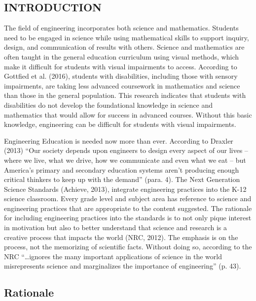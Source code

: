 \documentclass[11.5pt]{sig-alternate} %
\begin{document}
\begin{large}
\section*{INTRODUCTION}

The field of engineering incorporates both science and mathematics. Students need to be engaged in science while using mathematical skills to support inquiry, design, and communication of results with others. Science and mathematics are often taught in the general education curriculum using visual methods, which make it difficult for students with visual impairments to access. According to Gottfied et al. (2016), students with disabilities, including those with sensory impairments, are taking less advanced coursework in mathematics and science than those in the general population. This research indicates that students with disabilities do not develop the foundational knowledge in science and mathematics that would allow for success in advanced courses. Without this basic knowledge, engineering can be difficult for students with visual impairments.  

Engineering Education is needed now more than ever. According to Draxler (2013) “Our society depends upon engineers to design every aspect of our lives – where we live, what we drive, how we communicate and even what we eat – but America’s primary and secondary education systems aren’t producing enough critical thinkers to keep up with the demand” (para. 4). The Next Generation Science Standards (Achieve, 2013), integrate engineering practices into the K-12 science classroom. Every grade level and subject area has reference to science and engineering practices that are appropriate to the content suggested. The rationale for including engineering practices into the standards is to not only pique interest in motivation but also to better understand that science and research is a creative process that impacts the world (NRC, 2012). The emphasis is on the process, not the memorizing of scientific facts. Without doing so, according to the NRC “…ignores the many important applications of science in the world misrepresents science and marginalizes the importance of engineering” (p. 43).  

\subsection*{Rationale}


\end{large}
\end{document}
